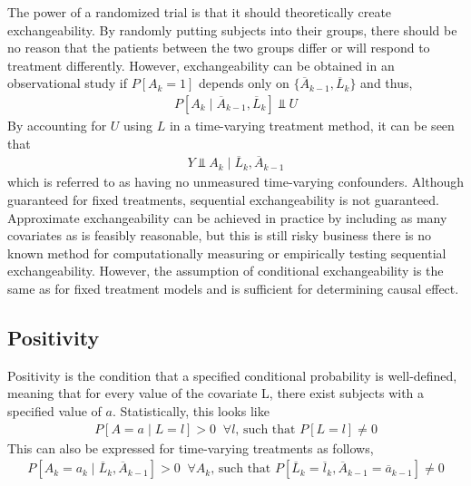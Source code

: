 The power of a randomized trial is that it should theoretically create exchangeability.  By randomly putting subjects into their groups, there should be no reason that the patients between the two groups differ or will respond to treatment differently.  However, exchangeability can be obtained in an observational study if $P[A_k = 1]$ depends only on $\{\overline{A}_{k-1}, \overline{L}_{k} \}$ and thus, 
\begin{align}
P[A_k \mid \overline{A}_{k-1}, \overline{L}_{k} ] \Perp U
\end{align}
By accounting for $U$ using $L$ in a time-varying treatment method, it can be seen that 
\begin{align} 
Y \Perp A_k \mid  \overline{L}_{k}, \overline{A}_{k-1}
\end{align}
which is referred to as having no unmeasured time-varying confounders.  Although guaranteed for fixed treatments, sequential exchangeability is not guaranteed.\cite{wright2015international}  Approximate exchangeability can be achieved in practice by including as many covariates as is feasibly reasonable, but this is still risky business there is no known method for computationally measuring or empirically testing sequential exchangeability.  However, the assumption of conditional exchangeability is the same as for fixed treatment models and is sufficient for determining causal effect. 

      
\subsection{Positivity} 
Positivity is the condition that a specified conditional probability is well-defined, meaning that for every value of the covariate L, there exist subjects with a specified value of $a$.\cite{hernan2006estimating}  Statistically, this looks like 
\begin{align}
P[A=a \mid L=l] > 0 \;\; \forall l \text{, such that } P[L=l] \neq 0
\end{align} 
This can also be expressed for time-varying treatments as follows, 
\begin{align} 
P[A_k = a_k \mid \overline{L}_{k}, \overline{A}_{k-1}] > 0 \;\;  \forall A_k \text{, such that } P[\overline{L}_k = \overline{l}_k, \overline{A}_{k-1} = \overline{a}_{k-1} ] \neq 0
\end{align} 





